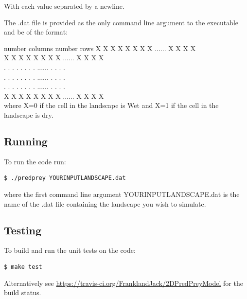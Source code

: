 With each value separated by a newline.

The .dat file is provided as the only command line argument to the executable and  be of the format:

number columns number rows  
X X X X X X X X ...... X X X X  \\
X X X X X X X X ...... X X X X  \\
. . . . . . . . ...... . . . .  \\
. . . . . . . . ...... . . . .  \\
. . . . . . . . ...... . . . .  \\
X X X X X X X X ...... X X X X  \\

where X=0 if the cell in the landscape is Wet and X=1 if the cell in the landscape is dry. 


\subsection{Running}
To run the code run:
\begin{lstlisting}[language=bash]
$ ./predprey YOURINPUTLANDSCAPE.dat

\end{lstlisting}
where the first command line argument YOURINPUTLANDSCAPE.dat is the name of the .dat file containing the landscape you wish to simulate. 
\subsection{Testing}
To build and run the unit tests on the code:
\begin{lstlisting}[language=bash]
$ make test
\end{lstlisting}
Alternatively see \url{https://travis-ci.org/FranklandJack/2DPredPreyModel} for the build status.

